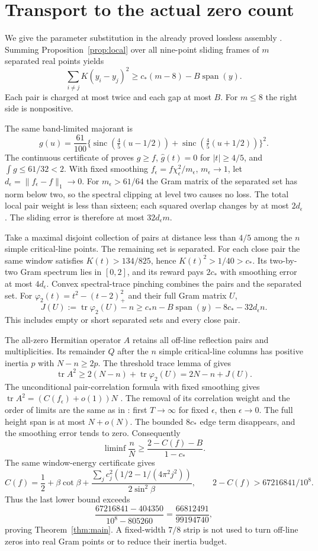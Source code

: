 \documentclass[11pt,a4paper]{article}
\DeclareMathOperator{\tr}{tr}
\DeclareMathOperator{\sinc}{sinc}
\begin{document}
\section{Transport to the actual zero count}

We give the parameter substitution in the already proved lossless
assembly \cite{Joint,Lossless}. Summing Proposition~\ref{prop:local}
over all nine-point sliding frames of $m$ separated real points yields
\[
 \sum_{i\ne j}K(y_i-y_j)^2\ge c_*(m-8)-B\operatorname{span}(y).
\]
Each pair is charged at most twice and each gap at most $B$.
For $m\le8$ the right side is nonpositive.

The same band-limited majorant is
\[
 g(u)=\frac{61}{100}
 \{\sinc(\tfrac45(u-1/2))+\sinc(\tfrac45(u+1/2))\}^2.
\]
The continuous certificate of \cite{Lossless,Joint} proves $g\ge f$,
$\widehat g(t)=0$ for $|t|\ge4/5$, and $\int g\le61/32<2$.
With fixed smoothing $f_\epsilon=f\chi_\epsilon^2/m_\epsilon$,
$m_\epsilon\to1$, let $d_\epsilon=\|f_\epsilon-f\|_1\to0$.
For $m_\epsilon>61/64$ the Gram matrix of the separated set has
norm below two, so the spectral clipping at level two causes no loss.
The total local pair weight is less than sixteen; each squared overlap
changes by at most $2d_\epsilon$. The sliding error is therefore at
most $32d_\epsilon m$.

Take a maximal disjoint collection of pairs at distance less than $4/5$
among the $n$ simple critical-line points. The remaining set is separated.
For each close pair the same window satisfies $K(t)>134/825$, hence
$K(t)^2>1/40>c_*$. Its two-by-two Gram spectrum lies in $[0,2]$,
and its reward pays $2c_*$ with smoothing error at most $4d_\epsilon$.
Convex spectral-trace pinching combines the pairs and the separated set.
For $\varphi_2(t)=t^2-(t-2)_+^2$ and their full Gram matrix $U$,
\[
 J(U):=\tr\varphi_2(U)-n
 \ge c_*n-B\operatorname{span}(y)-8c_*-32d_\epsilon n.
\]
This includes empty or short separated sets and every close pair.

The all-zero Hermitian operator $A$ retains all off-line reflection
pairs and multiplicities. Its remainder $Q$ after the $n$ simple
critical-line columns has positive inertia $p$ with $N-n\ge2p$.
The threshold trace lemma of \cite{Joint,Knaus} gives
\[
 \tr A^2\ge2(N-n)+\tr\varphi_2(U)=2N-n+J(U).
\]
The unconditional pair-correlation formula with fixed smoothing gives
$\tr A^2=(C(f_\epsilon)+o(1))N$ \cite{BGST,Lamzouri}.
The removal of its correlation weight and the order of limits are the
same as in \cite{Joint}: first $T\to\infty$ for fixed $\epsilon$,
then $\epsilon\to0$. The full height span is at most $N+o(N)$.
The bounded $8c_*$ edge term disappears, and the smoothing error tends
to zero. Consequently
\[
 \liminf\frac{n}{N}\ge\frac{2-C(f)-B}{1-c_*}.
\]
The same window-energy certificate gives
\[
 C(f)=\frac12+\beta\cot\beta+
 \frac{\sum_jc_j^2(1/2-1/(4\pi^2j^2))}{2\sin^2\beta},
 \qquad 2-C(f)>67216841/10^8.
\]
Thus the last lower bound exceeds
\[
 \frac{67216841-404350}{10^8-805260}
 =\frac{66812491}{99194740},
\]
proving Theorem~\ref{thm:main}. A fixed-width $7/8$ strip is not
used to turn off-line zeros into real Gram points or to reduce their
inertia budget.
\end{document}
